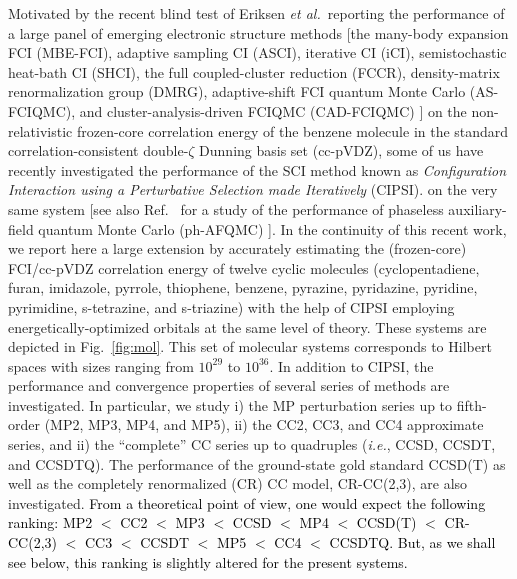 \documentclass[aip,jcp,reprint,noshowkeys,superscriptaddress,floatfix]{revtex4-1}
\newcommand{\ie}{\textit{i.e.}}
\newcommand{\alert}[1]{\textcolor{black}{#1}}
\begin{document}
Motivated by the recent blind test of Eriksen \textit{et al.}\cite{Eriksen_2020}~reporting the performance of a large panel of emerging electronic structure methods [the many-body expansion FCI (MBE-FCI), \cite{Eriksen_2017,Eriksen_2018,Eriksen_2019a,Eriksen_2019b} adaptive sampling CI (ASCI), \cite{Tubman_2016,Tubman_2018,Tubman_2020} iterative CI (iCI), \cite{Liu_2014,Liu_2016,Lei_2017,Zhang_2020} semistochastic heat-bath CI (SHCI), \cite{Holmes_2016,Holmes_2017,Sharma_2017} the full coupled-cluster reduction (FCCR), \cite{Xu_2018,Xu_2020} density-matrix renormalization group (DMRG), \cite{White_1992,White_1993,Chan_2011} adaptive-shift FCI quantum Monte Carlo (AS-FCIQMC), \cite{Booth_2009,Cleland_2010,Ghanem_2019} and cluster-analysis-driven FCIQMC (CAD-FCIQMC) \cite{Deustua_2017,Deustua_2018}] on the non-relativistic frozen-core correlation energy of the benzene molecule in the standard correlation-consistent double-$\zeta$ Dunning basis set (cc-pVDZ), some of us have recently investigated the performance of the SCI method known as \textit{Configuration Interaction using a Perturbative Selection made Iteratively} (CIPSI). \cite{Huron_1973,Giner_2013,Giner_2015,Garniron_2018,Garniron_2019} on the very same system \cite{Loos_2020e} [see also Ref.~ for a study of the performance of phaseless auxiliary-field quantum Monte Carlo (ph-AFQMC) \cite{Motta_2018}].
In the continuity of this recent work, we report here a large extension by accurately estimating the (frozen-core) FCI/cc-pVDZ correlation energy of twelve cyclic molecules (cyclopentadiene, furan, imidazole, pyrrole, thiophene, benzene, pyrazine, pyridazine, pyridine, pyrimidine, s-tetrazine, and s-triazine) with the help of CIPSI employing energetically-optimized orbitals at the same level of theory. \cite{Yao_2020,Yao_2021}
These systems are depicted in Fig.~\ref{fig:mol}.
This set of molecular systems corresponds to Hilbert spaces with sizes ranging from $10^{29}$ to $10^{36}$.
In addition to CIPSI, the performance and convergence properties of several series of methods are investigated.
In particular, we study i) the MP perturbation series up to fifth-order (MP2, MP3, MP4, and MP5), ii) the CC2, CC3, and CC4 approximate series, and ii) the ``complete'' CC series up to quadruples (\ie, CCSD, CCSDT, and CCSDTQ).
The performance of the ground-state gold standard CCSD(T) as well as the completely renormalized (CR) CC model, CR-CC(2,3), \cite{Kowalski_2000a,Kowalski_2000b,Piecuch_2002a,Piecuch_2002b,Piecuch_2005} are also investigated.
\alert{From a theoretical point of view, one would expect the following ranking: MP2 $<$ CC2 $<$ MP3 $<$ CCSD $<$ MP4 $<$ CCSD(T) $<$ CR-CC(2,3) $<$ CC3 $<$ CCSDT $<$ MP5 $<$ CC4 $<$ CCSDTQ. But, as we shall see below, this ranking is slightly altered for the present systems.}
\end{document}
